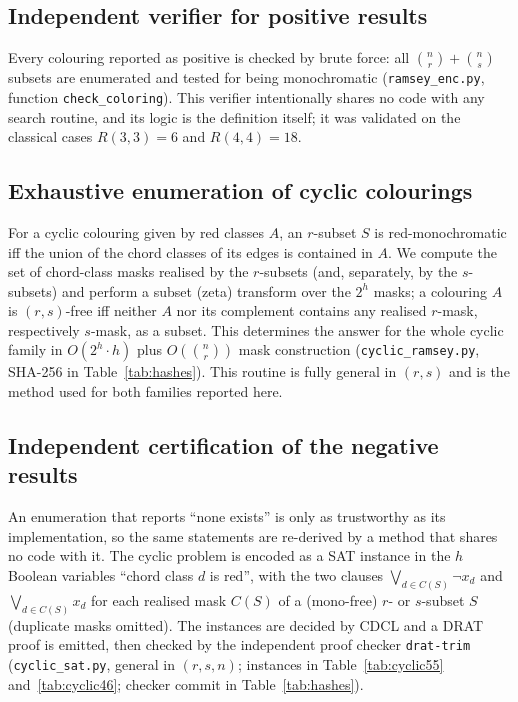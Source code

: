 \documentclass[11pt]{article}
\theoremstyle{definition}
\theoremstyle{plain}
\newcommand{\R}[2]{\ensuremath{R(#1,#2)}}
\begin{document}
\subsection{Independent verifier for positive results}\label{sec:verifier}
Every colouring reported as positive is checked by brute force: all
$\binom{n}{r} + \binom{n}{s}$ subsets are enumerated and tested for being
monochromatic (\texttt{ramsey\_enc.py}, function \texttt{check\_coloring}).
This verifier intentionally shares no code with any search routine, and its
logic is the definition itself; it was validated on the classical cases
$\R{3}{3} = 6$ and $\R{4}{4} = 18$.

\subsection{Exhaustive enumeration of cyclic colourings}\label{sec:enumerate}
For a cyclic colouring given by red classes $A$, an $r$-subset $S$ is
red-monochromatic iff the union of the chord classes of its edges is contained
in $A$. We compute the set of chord-class masks realised by the $r$-subsets
(and, separately, by the $s$-subsets) and perform a subset (zeta) transform
over the $2^h$ masks; a colouring $A$ is $(r,s)$-free iff neither $A$ nor its
complement contains any realised $r$-mask, respectively $s$-mask, as a subset.
This determines the answer for the whole cyclic family in $O(2^h \cdot h)$
plus $O(\binom{n}{r})$ mask construction
(\texttt{cyclic\_ramsey.py}, SHA-256 in Table~\ref{tab:hashes}). This routine
is fully general in $(r,s)$ and is the method used for both families reported
here.

\subsection{Independent certification of the negative results}\label{sec:cdcl}
An enumeration that reports ``none exists'' is only as trustworthy as its
implementation, so the same statements are re-derived by a method that shares
no code with it. The cyclic problem is encoded as a SAT instance in the $h$
Boolean variables ``chord class $d$ is red'', with the two clauses
$\bigvee_{d \in C(S)} \neg x_d$ and $\bigvee_{d \in C(S)} x_d$ for each
realised mask $C(S)$ of a (mono-free) $r$- or $s$-subset $S$ (duplicate masks
omitted). The instances are decided by CDCL and a DRAT proof is emitted, then
checked by the independent proof checker \texttt{drat-trim}
(\texttt{cyclic\_sat.py}, general in $(r,s,n)$; instances in
Table~\ref{tab:cyclic55} and~\ref{tab:cyclic46}; checker commit in
Table~\ref{tab:hashes}).
\end{document}
